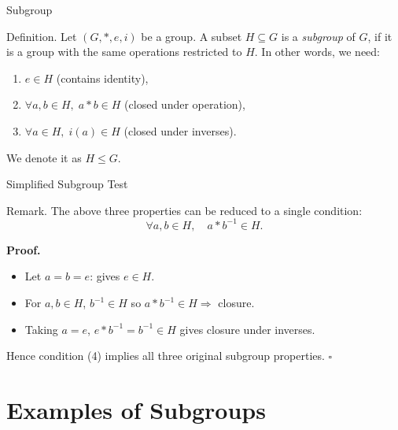 \documentclass[11pt,aspectratio=43,ignorenonframetext,t]{beamer}
\begin{document}
\begin{frame}{Subgroup}
\begin{block}{Definition.}  
Let $(G, *, e, i)$ be a group. A subset \(H \subseteq G\) is a \emph{subgroup} of \(G\), if it is a group with the same operations restricted to $H$. In other words, we need:

\begin{enumerate}
  \item \(e \in H\) \hfill (contains identity),
  \item \(\forall a,b \in H,\; a*b \in H\) \hfill (closed under operation),
  \item \(\forall a \in H,\; i(a) \in H\) \hfill (closed under inverses).
\end{enumerate}

We denote it as \(H \leq G.\)
\end{block}
\end{frame}

\begin{frame}{Simplified Subgroup Test}
\begin{block}{Remark.}  
The above three properties can be reduced to a single condition:
\[
\forall a,b \in H,\quad a * b^{-1} \in H.
\]

\textbf{Proof.}
\begin{itemize}
  \item Let \(a=b=e\): gives \(e\in H\).
  \item For \(a,b\in H\), \(b^{-1}\in H\) so \(a*b^{-1}\in H \Rightarrow\) closure.
  \item Taking \(a=e\), \(e*b^{-1}=b^{-1}\in H\) gives closure under inverses.
\end{itemize}

Hence condition (4) implies all three original subgroup properties. \(\square\)
\end{block}
\end{frame}

\section{Examples of Subgroups}
\end{document}
